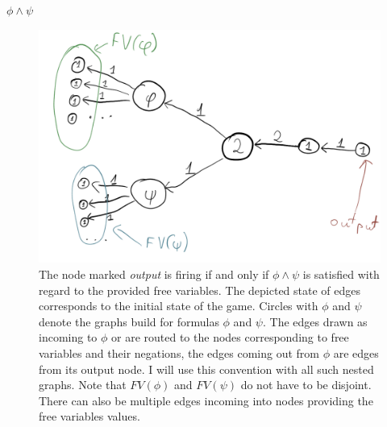 \noindent
\underline{$\phi \land \psi$}
\begin{figure}[H]
      \centering
      \caption{
            The node marked \textit{output} is firing if and only if $\phi \land \psi$
            is satisfied with regard to the provided free variables.
            The depicted state of edges corresponds to the initial state of the game.
            Circles with $\phi$ and $\psi$ denote the graphs build for formulas $\phi$ and $\psi$.
            The edges drawn as incoming to $\phi$ or are routed to the nodes corresponding to
            free variables and their negations, the edges coming out from $\phi$ are edges from its
            output node. I will use this convention with all such nested graphs.
            Note that $FV(\phi)$ and $FV(\psi)$ do not have to be disjoint. There can also be
            multiple edges incoming into nodes providing the free variables values.
      }
      \includegraphics[scale=0.2]{content/graphics/game10.png}
\end{figure}

